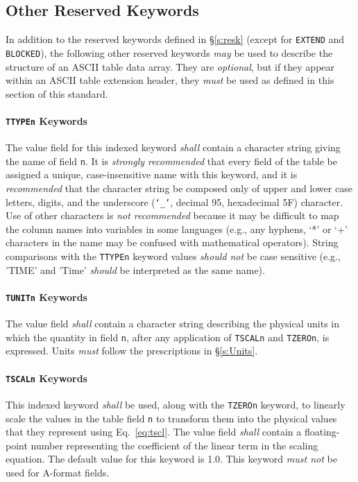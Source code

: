 \documentclass[11pt,makeidx]{book}     %
\begin{document}
 \subsection{Other Reserved Keywords}
 \label{s:atork}
  In addition to the reserved keywords defined in  \S\ref{s:resk} (except for {\tt EXTEND}
   and {\tt BLOCKED}), 
   the following other reserved keywords {\em may} be used to describe the structure of an
  ASCII table data array. They are {\em optional}, but if they
  appear within an ASCII table extension header, they {\em must}
  be used as defined in this section of this standard. 

   \paragraph{{\tt TTYPEn} Keywords} 
 The value field for this indexed keyword {\em shall} contain a
 character string giving the name of field {\tt n}.  
 It is {\em strongly recommended} that every field of the table be 
 assigned a unique, case-insensitive  name with this keyword, and it is 
 {\em recommended} that the character string be composed only of upper and 
 lower case letters, digits, and the underscore ({\tt `\_'}, decimal 95, 
 hexadecimal 5F) character.  Use of other characters is {\em not recommended} 
 because it may be difficult to map the column names into variables in some
 languages (e.g., any hyphens, `*'  or `+' characters in the name may be confused
 with mathematical operators).
 String comparisons with the {\tt TTYPEn} keyword values {\em should not}
 be case sensitive (e.g., 'TIME' and 'Time' {\em should} be interpreted as the 
 same name).
 
   \paragraph{{\tt TUNITn} Keywords}
 The value field {\em shall} contain a character 
 string describing the physical units 
 in which the quantity in field 
 {\tt n}, after any application of {\tt TSCALn}
 and {\tt TZEROn}, is expressed. Units {\em must} follow the 
 prescriptions in \S\ref{s:Units}.  

   \paragraph{{\tt TSCALn} Keywords}
   This indexed keyword {\em shall} be used, along with the {\tt TZEROn}
 keyword, to linearly scale the values in the table field {\tt n}
 to transform them
 into the physical values that they
 represent using Eq.\ \ref{eq:tscl}. The value field {\em shall}
 contain a floating-point number representing the coefficient of
 the linear term in the scaling equation.  The
 default value for this keyword is 1.0.  
 This keyword {\em must not} be used for A-format fields.
\end{document}
